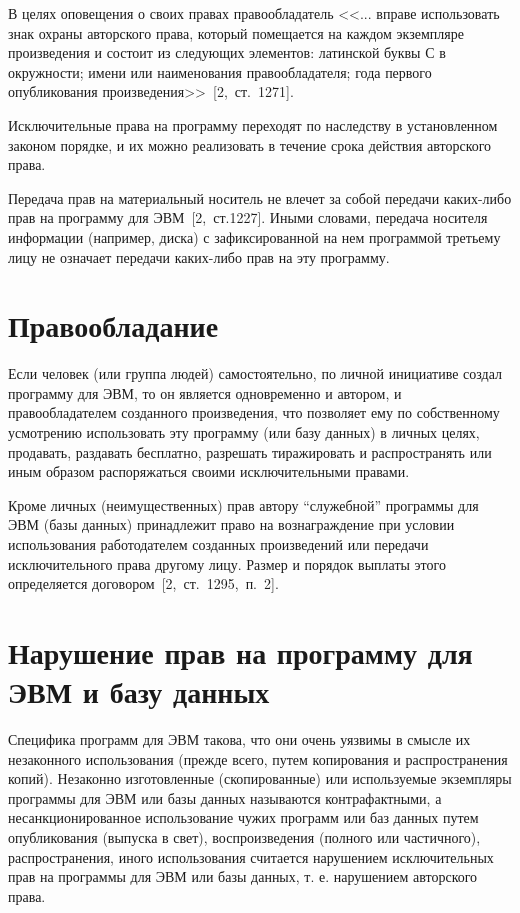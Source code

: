 В целях оповещения о своих правах правообладатель <<... вправе использовать знак охраны авторского права,
который помещается на каждом экземпляре произведения и состоит из следующих элементов:
латинской буквы С в окружности; имени или наименования правообладателя; года первого опубликования
произведения>>~[2,~ст.~1271].

Исключительные права на программу переходят по наследству в установленном законом порядке, и их можно
реализовать в течение срока действия авторского права.

Передача прав на материальный носитель не влечет за собой передачи каких-либо прав на программу для
ЭВМ~[2,~ст.1227]. Иными словами, передача носителя информации (например, диска) с зафиксированной на
нем программой третьему лицу не означает передачи каких-либо прав на эту программу.

\section{Правообладание}

Если человек (или группа людей) самостоятельно, по личной инициативе создал программу для ЭВМ,
то он является одновременно и автором, и правообладателем созданного произведения, что позволяет ему по
собственному усмотрению использовать эту программу (или базу данных) в личных целях, продавать, раздавать
бесплатно, разрешать тиражировать и распространять или иным образом распоряжаться своими исключительными правами.

Кроме личных (неимущественных) прав автору “служебной” программы для ЭВМ (базы данных) принадлежит
право на вознаграждение при условии использования работодателем созданных произведений или передачи
исключительного права другому лицу. Размер и порядок выплаты этого определяется договором~[2,~ст.~1295,~п.~2].

\section{Нарушение прав на программу для ЭВМ и базу данных}

Специфика программ для ЭВМ такова, что они очень уязвимы в смысле их незаконного использования
(прежде всего, путем копирования и распространения копий). Незаконно изготовленные (скопированные)
или используемые экземпляры программы для ЭВМ или базы данных называются контрафактными, а
несанкционированное использование чужих программ или баз данных путем опубликования (выпуска в свет),
воспроизведения (полного или частичного), распространения, иного использования считается нарушением
исключительных прав на программы для ЭВМ или базы данных, т. е. нарушением авторского права.

